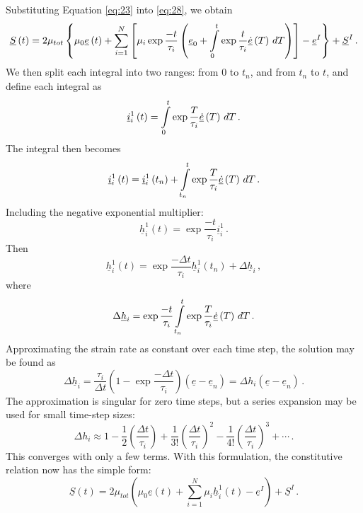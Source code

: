 Substituting Equation \vref{eq:23} into \vref{eq:28}, we obtain
\begin{equation}
\underline{S}\left(t\right)=2\mu_{tot}\left\{ \mu_{0}\underline{e}\left(t\right)+\sum_{i=1}^{N}\left[\mu_{i}\exp\frac{-t}{\tau_{i}}\left(\underline{e}_{0}+\intop_{0}^{t}\exp\frac{t}{\tau_{i}}\underline{\dot{e}}\left(T\right)\, dT\right)\right]-\underline{e}^{I}\right\} +\underline{S}^{I}\,.\label{eq:29}
\end{equation}
We then split each integral into two ranges: from 0 to $t_{n}$, and
from $t_{n}$ to $t$, and define each integral as
\begin{equation}
\underline{i}_{i}^{1}\left(t\right)=\intop_{0}^{t}\exp\frac{T}{\tau_{i}}\underline{\dot{e}}\left(T\right)\, dT\,.\label{eq:30}
\end{equation}
The integral then becomes
\begin{equation}
\underline{i}_{i}^{1}\left(t\right)=\underline{i}_{i}^{1}\left(t_{n}\right)+\intop_{t_{n}}^{t}\exp\frac{T}{\tau_{i}}\underline{\dot{e}}\left(T\right)\, dT\,.\label{eq:31}
\end{equation}
Including the negative exponential multiplier:
\begin{equation}
\underline{h}_{i}^{1}\left(t\right)=\exp\frac{-t}{\tau_{i}}\underline{i}_{i}^{1}\,.\label{eq:32}
\end{equation}
Then
\begin{equation}
\underline{h}_{i}^{1}\left(t\right)=\exp\frac{-\Delta t}{\tau_{i}}\underline{h}_{i}^{1}\left(t_{n}\right)+\Delta\underline{h}_{i}\,,\label{eq:33}
\end{equation}
where
\begin{equation}
\Delta\underline{h}_{i}=\exp\frac{-t}{\tau_{i}}\intop_{t_{n}}^{t}\exp\frac{T}{\tau_{i}}\underline{\dot{e}}\left(T\right)\, dT\,.\label{eq:34}
\end{equation}
Approximating the strain rate as constant over each time step, the
solution may be found as
\begin{equation}
\Delta\underline{h}_{i}=\frac{\tau_{i}}{\Delta t}\left(1-\exp\frac{-\Delta t}{\tau_{i}}\right)\left(\underline{e}-\underline{e}_{n}\right)=\Delta h_{i}\left(\underline{e}-\underline{e}_{n}\right)\,.\label{eq:35}
\end{equation}
The approximation is singular for zero time steps, but a series expansion
may be used for small time-step sizes:
\begin{equation}
\Delta h_{i}\approx1-\frac{1}{2}\left(\frac{\Delta t}{\tau_{i}}\right)+\frac{1}{3!}\left(\frac{\Delta t}{\tau_{i}}\right)^{2}-\frac{1}{4!}\left(\frac{\Delta t}{\tau_{i}}\right)^{3}+\cdots\,.\label{eq:36}
\end{equation}
This converges with only a few terms. With this formulation, the constitutive
relation now has the simple form:
\begin{equation}
\underline{S}\left(t\right)=2\mu_{tot}\left(\mu_{0}\underline{e}\left(t\right)+\sum_{i=1}^{N}\mu_{i}\underline{h}_{i}^{1}\left(t\right)-\underline{e}^{I}\right)+\underline{S}^{I}\,.\label{eq:37}
\end{equation}


